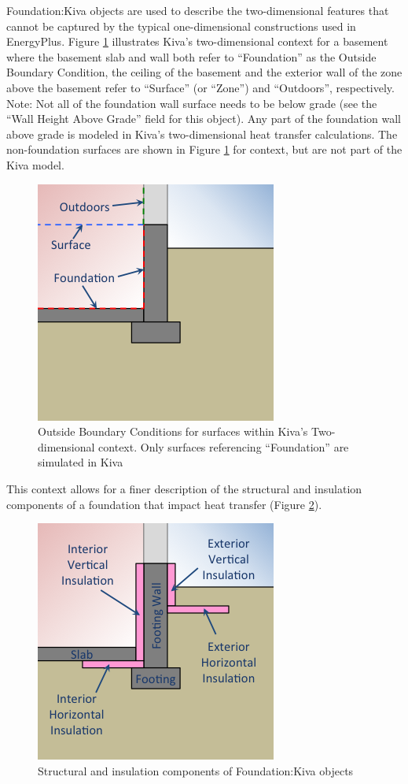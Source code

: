 Foundation:Kiva objects are used to describe the two-dimensional
features that cannot be captured by the typical one-dimensional
constructions used in EnergyPlus. Figure \ref{fig:context} illustrates
Kiva's two-dimensional context for a basement where the basement slab
and wall both refer to ``Foundation'' as the Outside Boundary Condition,
the ceiling of the basement and the exterior wall of the zone above the
basement refer to ``Surface'' (or ``Zone'') and ``Outdoors'',
respectively. Note: Not all of the foundation wall surface needs to be
below grade (see the ``Wall Height Above Grade'' field for this object).
Any part of the foundation wall above grade is modeled in Kiva's
two-dimensional heat transfer calculations. The non-foundation surfaces
are shown in Figure \ref{fig:context} for context, but are not part of the
Kiva model.

\begin{figure}
\centering
\includegraphics{media/kiva-2d-otherside.png}
\caption{Outside Boundary Conditions for surfaces within Kiva's
Two-dimensional context. Only surfaces referencing ``Foundation'' are
simulated in Kiva\label{fig:context}}
\end{figure}

This context allows for a finer description of the structural and
insulation components of a foundation that impact heat transfer (Figure
\ref{fig:el}).

\begin{figure}
\centering
\includegraphics{media/kiva-2d-elements.png}
\caption{Structural and insulation components of Foundation:Kiva
objects\label{fig:el}}
\end{figure}

